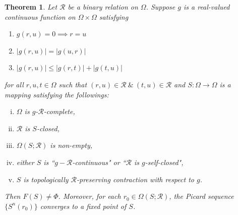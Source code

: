 \documentclass[10pt, reqno]{amsart}
\newtheorem{theorem}{Theorem}[section]
\theoremstyle{definition}
\theoremstyle{remark}
\numberwithin{equation}{section}
\begin{document}
\begin{theorem}\label{main thm}
	 Let $\mathcal{R}$ be a binary relation on   $ \Omega $.  Suppose $ g  $  is a real-valued continuous	function on $ \Omega \times \Omega $ satisfying 
	 \begin{enumerate}[(g1)]
	 	\item $ g ( r, u ) = 0 \implies r = u $ 
	 	\item $ | g ( r, u ) | = | g ( u, r ) | $ 
	 	\item $ |g( r, u )| \leq |g(r, t ) | + | g ( t, u ) | $
	 \end{enumerate}  
     
 for all $ r, u, t  \in \Omega $ such that $ ( r, u ) \in \mathcal{R} ~ \& ~ ( t, u ) \in \mathcal{R} $   and $ S : \Omega \to \Omega $ is a mapping satisfying the followings:  
	\begin{enumerate}[(i)]
		\item $ \Omega$ is $g$-$\mathcal{R}$-complete,
		\item $\mathcal{R}$ is $ S $-closed,
		\item $ \Omega ( S;\mathcal{R})$ is non-empty,
		\item either $ S$ is ``$g-\mathcal{R}$-continuous" or ``$\mathcal{R}$ is $g$-self-closed",
		\item $ S $ is topologically $\mathcal{R}$-preserving contraction with respect to $g$.\label{iii} 
	\end{enumerate} 
    
	Then $ F (  S ) \neq \Phi $. Moreover, for each $r_0\in \Omega ( S ;\mathcal{R})$, the Picard sequence $ \{ S^n(r_0) \} $   converges to a fixed point of $S$.     
\end{theorem}
\end{document}
